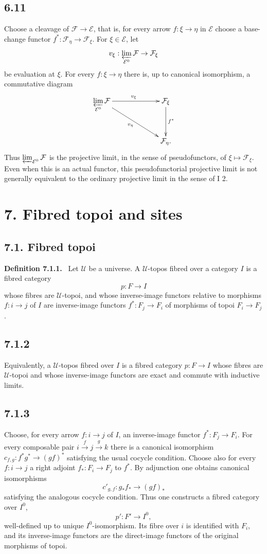 \documentclass[11pt]{article}
\newcommand{\U}{\mathcal{U}}
\newcommand{\E}{\mathcal{E}}
\newcommand{\F}{\mathcal{F}}
\newenvironment{statement}[1]{\par\medskip\noindent\textbf{#1.}\ }{\par\medskip}
\begin{document}
\subsection*{6.11}
Choose a cleavage of \(\F\to\E\), that is, for every arrow \(f:\xi\to\eta\) in \(\E\) choose a base-change functor \(f^*:\F_\eta\to\F_\xi\). For \(\xi\in\E\), let
\[
 v_\xi:\varprojlim_{\E^0}\F\to\F_\xi
\]
be evaluation at \(\xi\). For every \(f:\xi\to\eta\) there is, up to canonical isomorphism, a commutative diagram
\[
\xymatrix@C=2.25cm@R=1.25cm{
\displaystyle\varprojlim_{\E^0}\F\ar[r]^{v_\xi}\ar[rd]_{v_\eta}&\F_\xi\ar[d]^{f^*}\\
&\F_\eta.
}
\]
Thus \(\varprojlim_{\E^0}\F\) is the projective limit, in the sense of pseudofunctors, of \(\xi\mapsto\F_\xi\). Even when this is an actual functor, this pseudofunctorial projective limit is not generally equivalent to the ordinary projective limit in the sense of I 2.

\section*{7. Fibred topoi and sites}

\subsection*{7.1. Fibred topoi}

\begin{statement}{Definition 7.1.1}
Let \(\U\) be a universe. A \(\U\)-topos fibred over a category \(I\) is a fibred category
\[
 p:F\to I
\]
whose fibres are \(\U\)-topoi, and whose inverse-image functors relative to morphisms \(f:i\to j\) of \(I\) are inverse-image functors \(f^*:F_j\to F_i\) of morphisms of topoi \(F_i\to F_j\).
\end{statement}

\subsection*{7.1.2}
Equivalently, a \(\U\)-topos fibred over \(I\) is a fibred category \(p:F\to I\) whose fibres are \(\U\)-topoi and whose inverse-image functors are exact and commute with inductive limits.

\subsection*{7.1.3}
Choose, for every arrow \(f:i\to j\) of \(I\), an inverse-image functor \(f^*:F_j\to F_i\). For every composable pair \(i\xrightarrow f j\xrightarrow g k\) there is a canonical isomorphism \(c_{f,g}:f^*g^*\to(gf)^*\) satisfying the usual cocycle condition. Choose also for every \(f:i\to j\) a right adjoint \(f_*:F_i\to F_j\) to \(f^*\). By adjunction one obtains canonical isomorphisms
\[
 c'_{g,f}:g_*f_*\to(gf)_* \tag{7.1.3.1}
\]
satisfying the analogous cocycle condition. Thus one constructs a fibred category over \(I^0\),
\[
 p':F'\to I^0, \tag{7.1.3.2}
\]
well-defined up to unique \(I^0\)-isomorphism. Its fibre over \(i\) is identified with \(F_i\), and its inverse-image functors are the direct-image functors of the original morphisms of topoi.
\end{document}
